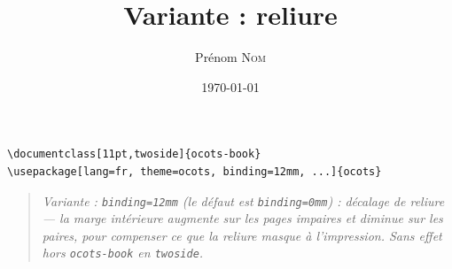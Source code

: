 \documentclass[11pt,twoside]{ocots-book}
\title{Variante : reliure}
\author{Prénom \textsc{Nom}}
\date{\today}
\newcommand{\ocotsvariantnote}[1]{\begin{quote}\itshape Variante : #1\end{quote}}
\begin{document}
\begin{lstlisting}
\documentclass[11pt,twoside]{ocots-book}
\usepackage[lang=fr, theme=ocots, binding=12mm, ...]{ocots}
\end{lstlisting}
\ocotsvariantnote{\texttt{binding=12mm} (le défaut est \texttt{binding=0mm}) :
décalage de reliure — la marge intérieure augmente sur les pages impaires et
diminue sur les paires, pour compenser ce que la reliure masque à
l'impression. Sans effet hors \texttt{ocots-book} en \texttt{twoside}.}

\ocotscollectsolutions

\ocotsprintsolutions
\end{document}

